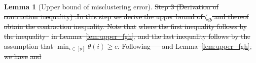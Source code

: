 \documentclass[lettersize,onecolumn,journal]{IEEEtran}
\theoremstyle{definition}
\newtheorem{lem}{Lemma}
\theoremstyle{definition}
\newcommand{\of}[1]{\left(#1\right)}
\newcommand{\offf}[1]{\left\{#1\right\}}
\providecommand{\DIFaddtex}[1]{{\protect\color{blue}\uwave{#1}}} %
\providecommand{\DIFdeltex}[1]{{\protect\color{red}\sout{#1}}}                      %
\providecommand{\DIFaddbegin}{} %
\providecommand{\DIFaddend}{} %
\providecommand{\DIFdelbegin}{} %
\providecommand{\DIFdelend}{} %
\providecommand{\DIFadd}[1]{\texorpdfstring{\DIFaddtex{#1}}{#1}} %
\providecommand{\DIFdel}[1]{\texorpdfstring{\DIFdeltex{#1}}{}} %
\newcommand{\DIFscaledelfig}{0.5}
\newlength{\DIFdelgraphicswidth} %
\newlength{\DIFdelgraphicsheight} %
\newcommand{\DIFaddincludegraphics}[2][]{{\color{blue}\fbox{\DIFOincludegraphics[#1]{#2}}}} %
\newcommand{\DIFdelincludegraphics}[2][]{%
\sbox{\DIFdelgraphicsbox}{\DIFOincludegraphics[#1]{#2}}%
\settoboxwidth{\DIFdelgraphicswidth}{\DIFdelgraphicsbox} %
\settoboxtotalheight{\DIFdelgraphicsheight}{\DIFdelgraphicsbox} %
\scalebox{\DIFscaledelfig}{%
\parbox[b]{\DIFdelgraphicswidth}{\usebox{\DIFdelgraphicsbox}\\[-\baselineskip] \rule{\DIFdelgraphicswidth}{0em}}\llap{\resizebox{\DIFdelgraphicswidth}{\DIFdelgraphicsheight}{%
\setlength{\unitlength}{\DIFdelgraphicswidth}%
\begin{picture}(1,1)%
\thicklines\linethickness{2pt} %
{\color[rgb]{1,0,0}\put(0,0){\framebox(1,1){}}}%
{\color[rgb]{1,0,0}\put(0,0){\line( 1,1){1}}}%
{\color[rgb]{1,0,0}\put(0,1){\line(1,-1){1}}}%
\end{picture}%
}\hspace*{3pt}}} %
} %
\DeclareRobustCommand{\DIFaddbegin}{\DIFOaddbegin \let\includegraphics\DIFaddincludegraphics} %
\DeclareRobustCommand{\DIFaddend}{\DIFOaddend \let\includegraphics\DIFOincludegraphics} %
\DeclareRobustCommand{\DIFdelbegin}{\DIFOdelbegin \let\includegraphics\DIFdelincludegraphics} %
\DeclareRobustCommand{\DIFdelend}{\DIFOaddend \let\includegraphics\DIFOincludegraphics} %
\begin{document}
\begin{lem}[Upper bound of misclustering error]
{%
\DIFdel{Step 3 (Derivation of contraction inequality) :}\DIFdelend \DIFaddbegin \DIFadd{\max_{a \in [r]} }\DIFadd{^2 }\over \DIFadd{\min_{a \in [r]} }\DIFadd{^2 }\DIFaddend }\DIFdelbegin \DIFdel{In this step we derive the upper bound of $\zeta_{ib}$ and thereof obtain the contraction inequality. Note that 
    }%
\DIFdel{where the first inequality follows by the inequality~}%
\DIFdel{in Lemma~\ref{lem:upper_fgh}, and the last inequality follows by the assumption that $\min_{i \in [p]} \theta(i) \geq c$. Following \mbox{%
\citet[Step 4, Proof of Theorem 2]{han2020exact} }\hspace{0pt}%
and Lemma~\ref{lem:upper_fgh}, we have 
    }%
\DIFdel{and 
    }%

\end{lem}
\end{document}
